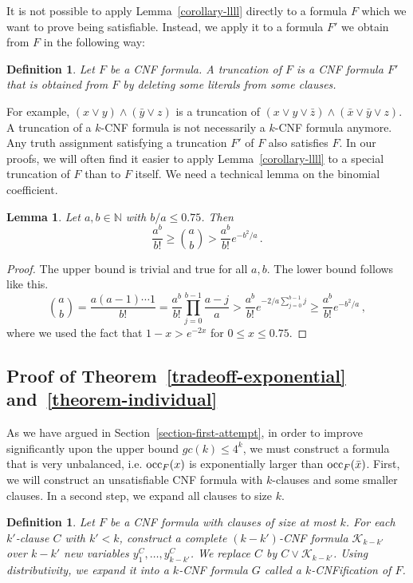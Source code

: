 \documentclass[a4paper, 11pt]{article}
\newtheorem{lemma}[theorem]{Lemma}
\newtheorem{definition}[theorem]{Definition}
\newcommand{\occ}{\ensuremath{{\rm{occ}}}}
\begin{document}
It is not possible to apply
Lemma~\ref{corollary-llll} directly to a formula $F$ which we want to prove
being satisfiable. Instead, we apply it to a formula $F'$ we obtain
from $F$ in the following way:

\begin{definition}
  Let $F$ be a CNF formula. A {\em truncation} of $F$ is a CNF formula
  $F'$ that is obtained from $F$ by deleting some literals from some
  clauses.
\end{definition}

For example, $(x \vee y) \wedge (\bar{y} \vee z)$ is a truncation of
$(x \vee y \vee \bar{z}) \wedge (\bar{x} \vee \bar{y} \vee z)$.  A
truncation of a $k$-CNF formula is not necessarily a $k$-CNF formula
anymore. Any truth assignment satisfying a truncation $F'$ of $F$ also
satisfies $F$. In our proofs, we will often find it easier to apply
Lemma~\ref{corollary-llll} to a special truncation of $F$ than to $F$
itself. We need a technical lemma on the binomial coefficient.
 
\begin{lemma}\label{lem:technical}
  Let $a,b\in \mathbb{N}$ with $b/a\leq 0.75$. Then
  \[
  \frac{a^b}{b!} \geq \binom{a}{b} > \frac{a^b}{b!} e^{-b^2/a}\,.
  \]
\end{lemma}

\begin{proof}
  The upper bound is trivial and true for all $a,b$. The lower bound
  follows like this.
\[
\binom{a}{b} = \frac{a(a-1)\cdots 1}{b!} = \frac{a^b}{b!}
\prod_{j=0}^{b-1} \frac{a-j}{a} > \frac{a^b}{b!} e^{-2/a
  \sum_{j=0}^{b-1} j} \geq \frac{a^b}{b!} e^{-b^2/a}\,,
\]
where we used the fact that $1-x > e^{-2x}$ for $0\leq x \leq 0.75$.
\end{proof}


\subsection{Proof of Theorem~\ref{tradeoff-exponential} and~\ref{theorem-individual}}

As we have argued in Section~\ref{section-first-attempt}, in order to
improve significantly upon the upper bound $gc(k) \leq 4^k$, we must
construct a formula that is very unbalanced, i.e.  $\occ_F(x)$ is
exponentially larger than $\occ_F(\bar{x})$.
First, we will construct an unsatisfiable CNF formula with $k$-clauses
and some smaller clauses.
In a second step, we expand all
clauses to size $k$.


\begin{definition}
  Let $F$ be a CNF formula with clauses of size at most $k$.  For each
  $k'$-clause $C$ with $k'<k$, construct a complete $(k-k')$-CNF
  formula $\mathcal{K}_{k-k'}$ over $k-k'$ new variables
  $y^C_1,\dots,y^C_{k-k'}$. We replace $C$ by $C \vee
  \mathcal{K}_{k-k'}$. Using distributivity, we expand it into a
  $k$-CNF formula $G$ called a \emph{$k$-CNFification of $F$}.
\end{definition}
\end{document}
